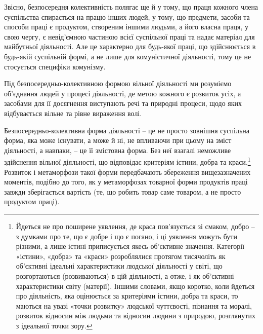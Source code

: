 \documentclass[12pt,a4paper,openany]{book}
\begin{document}
Звісно, безпосередня колективність полягає ще й у тому, що праця кожного члена суспільства спирається на працю інших людей, у тому, що предмети, засоби та способи праці є продуктом, створеним іншими людьми, а його власна праця, у свою чергу, є невід’ємною частиною всієї суспільної праці та надає матеріал для майбутньої діяльності. Але це характерно для будь-якої праці, що здійснюється в будь-якій суспільній формі, а не лише для комуністичної діяльності, тому це не стосується специфіки комунізму.

Під безпосередньо-колективною формою вільної діяльності ми розуміємо об’єднання людей у процесі діяльності, де метою кожного є розвиток усіх, а засобами для її досягнення виступають речі та природні процеси, щодо яких відбувається вільне та рівне вираження волі.

Безпосередньо-колективна форма діяльності – це не просто зовнішня суспільна форма, яка може існувати, а може й ні, не впливаючи при цьому на зміст діяльності, а навпаки, – це її змістовна форма. Без неї взагалі неможливе здійснення вільної діяльності, що відповідає критеріям істини, добра та краси.\footnote{Йдеться не про поширене уявлення, де краса пов’язується зі смаком, добро – з думками про те, що є добре і що є погано, і ці уявлення можуть бути різними, а лише істині приписується якесь об’єктивне значення. Категорії «істини», «добра» та «краси» розроблялися протягом тисячоліть як об’єктивні ідеальні характеристики людської діяльності у світі, що розгортаються (розвиваються) в цій діяльності, а отже, і як об’єктивні характеристики світу (матерії). Іншими словами, якщо коротко, коли йдеться про діяльність, яка оцінюється за критеріями істини, добра та краси, то маються на увазі «точки розвитку» людської чуттєвості, пізнання та моралі, розвиток відносин між людьми та відносин людини з природою, розглянутих з ідеальної точки зору.} Розвиток і метаморфози такої форми передбачають збереження вищезазначених моментів, подібно до того, як у метаморфозах товарної форми продуктів праці завжди зберігається вартість (те, що робить товар саме товаром, а не просто продуктом праці).
\end{document}
